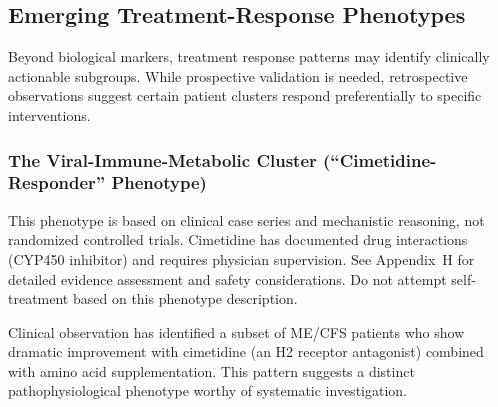 \subsection{Emerging Treatment-Response Phenotypes}
\label{sec:treatment-phenotypes}

Beyond biological markers, treatment response patterns may identify clinically actionable subgroups. While prospective validation is needed, retrospective observations suggest certain patient clusters respond preferentially to specific interventions.

\subsubsection{The Viral-Immune-Metabolic Cluster (``Cimetidine-Responder'' Phenotype)}
\label{sec:cimetidine-responder}

\begin{warning}
This phenotype is based on clinical case series and mechanistic reasoning, not randomized controlled trials. Cimetidine has documented drug interactions (CYP450 inhibitor) and requires physician supervision. See Appendix~H for detailed evidence assessment and safety considerations. Do not attempt self-treatment based on this phenotype description.
\end{warning}

Clinical observation has identified a subset of ME/CFS patients who show dramatic improvement with cimetidine (an H2 receptor antagonist) combined with amino acid supplementation. This pattern suggests a distinct pathophysiological phenotype worthy of systematic investigation.

